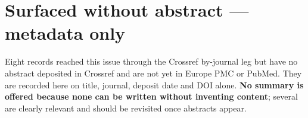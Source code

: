 \documentclass[10pt]{article}
\begin{document}
\vspace{4mm}

\section*{\sffamily\bfseries\color{Deep}Surfaced without abstract --- metadata only}
\vspace{-1.5mm}{\color{Amber}\rule{\linewidth}{1.1pt}}\vspace{2mm}

{\fontsize{7.4}{9}\selectfont\color{Slate}Eight records reached this issue through the
Crossref by-journal leg but have no abstract deposited in Crossref and are not yet in
Europe PMC or PubMed. They are recorded here on title, journal, deposit date and DOI
alone. \textbf{No summary is offered because none can be written without inventing
content}; several are clearly relevant and should be revisited once abstracts appear.\par}
\end{document}
